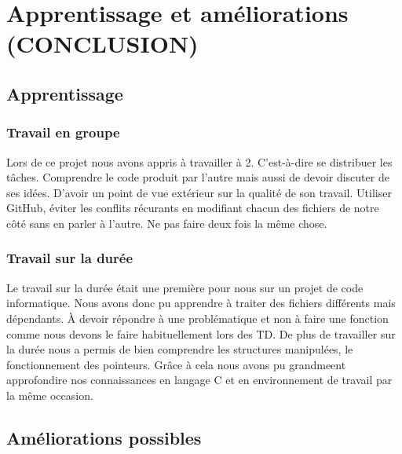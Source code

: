 \documentclass{article}
\begin{document}
\section{Apprentissage et améliorations (CONCLUSION)}

\vspace{1em}

\subsection{Apprentissage}

\vspace{1em}
\subsubsection{Travail en groupe}

\hspace{1em} Lors de ce projet nous avons appris à travailler à 2. C'est-à-dire se distribuer les tâches. Comprendre le code produit par l'autre mais aussi de devoir discuter de ses idées. D'avoir un point de vue extérieur sur la qualité de son travail. Utiliser GitHub, éviter les conflits récurants en modifiant chacun des fichiers de notre côté sans en parler à l'autre. Ne pas faire deux fois la même chose. 

\subsubsection{Travail sur la durée}

\hspace{1em} Le travail sur la durée était une première pour nous sur un projet de code informatique. Nous avons donc pu apprendre à traiter des fichiers différents mais dépendants. À devoir répondre à une problématique et non à faire une fonction comme nous devons le faire habituellement lors des TD. De plus de travailler sur la durée nous a permis de bien comprendre les structures manipulées, le fonctionnement des pointeurs. Grâce à cela nous avons pu grandmeent approfondire nos connaissances en langage C et en environnement de travail par la même occasion.  

\subsection{Améliorations possibles}
\end{document}
